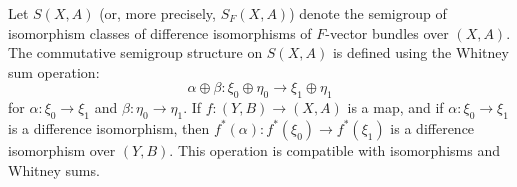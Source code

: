 Let $S(X, A)$ (or, more precisely, $S_F(X, A)$) denote the semigroup of isomorphism classes of difference isomorphisms of $F$-vector bundles over $(X, A)$. The commutative semigroup structure on $S(X, A)$ is defined using the Whitney sum operation:
$$\alpha \oplus \beta: \xi_0 \oplus \eta_0 \rightarrow \xi_1 \oplus \eta_1$$
for $\alpha: \xi_0 \rightarrow \xi_1$ and $\beta: \eta_0 \rightarrow \eta_1$. If $f: (Y, B) \rightarrow (X, A)$ is a map, and if $\alpha: \xi_0 \rightarrow \xi_1$ is a difference isomorphism, then $f^*(\alpha): f^*(\xi_0) \rightarrow f^*(\xi_1)$ is a difference isomorphism over $(Y, B)$. This operation is compatible with isomorphisms and Whitney sums.
